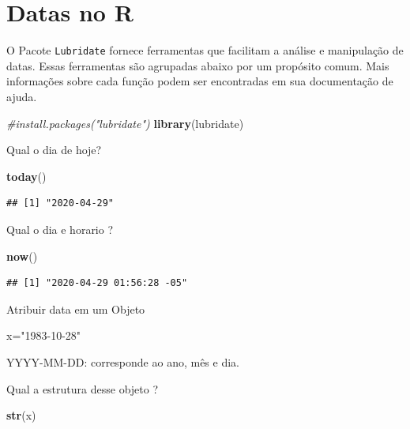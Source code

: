 \documentclass[
]{book}
\newenvironment{Shaded}{\begin{snugshade}}{\end{snugshade}}
\newcommand{\CommentTok}[1]{\textcolor[rgb]{0.56,0.35,0.01}{\textit{#1}}}
\newcommand{\KeywordTok}[1]{\textcolor[rgb]{0.13,0.29,0.53}{\textbf{#1}}}
\newcommand{\NormalTok}[1]{#1}
\newcommand{\StringTok}[1]{\textcolor[rgb]{0.31,0.60,0.02}{#1}}
\begin{document}
\hypertarget{datas-no-r}{%
\section{Datas no R}\label{datas-no-r}}

O Pacote \texttt{Lubridate} fornece ferramentas que facilitam a análise e manipulação de datas. Essas ferramentas são agrupadas abaixo por um propósito comum. Mais informações sobre cada função podem ser encontradas em sua documentação de ajuda.

\begin{Shaded}
\begin{Highlighting}[]
\CommentTok{#install.packages("lubridate")}
\KeywordTok{library}\NormalTok{(lubridate)}
\end{Highlighting}
\end{Shaded}

Qual o dia de hoje?

\begin{Shaded}
\begin{Highlighting}[]
\KeywordTok{today}\NormalTok{()}
\end{Highlighting}
\end{Shaded}

\begin{verbatim}
## [1] "2020-04-29"
\end{verbatim}

Qual o dia e horario ?

\begin{Shaded}
\begin{Highlighting}[]
\KeywordTok{now}\NormalTok{()}
\end{Highlighting}
\end{Shaded}

\begin{verbatim}
## [1] "2020-04-29 01:56:28 -05"
\end{verbatim}

Atribuir data em um Objeto

\begin{Shaded}
\begin{Highlighting}[]
\NormalTok{x=}\StringTok{"1983-10-28"}
\end{Highlighting}
\end{Shaded}

YYYY-MM-DD: corresponde ao ano, mês e dia.

Qual a estrutura desse objeto ?

\begin{Shaded}
\begin{Highlighting}[]
\KeywordTok{str}\NormalTok{(x)}
\end{Highlighting}
\end{Shaded}
\end{document}
